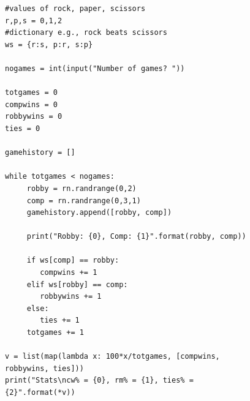 \documentclass{article}
\begin{document}
\begin{enumerate}
\begin{enumerate}
\begin{figure}[h]
{\begin{verbatim}
#values of rock, paper, scissors
r,p,s = 0,1,2
#dictionary e.g., rock beats scissors
ws = {r:s, p:r, s:p}

nogames = int(input("Number of games? "))

totgames = 0
compwins = 0
robbywins = 0
ties = 0

gamehistory = []

while totgames < nogames:
     robby = rn.randrange(0,2)
     comp = rn.randrange(0,3,1)
     gamehistory.append([robby, comp])

     print("Robby: {0}, Comp: {1}".format(robby, comp))

     if ws[comp] == robby:
        compwins += 1
     elif ws[robby] == comp:
        robbywins += 1
     else:
        ties += 1
     totgames += 1

v = list(map(lambda x: 100*x/totgames, [compwins, robbywins, ties]))
print("Stats\ncw% = {0}, rm% = {1}, ties% = {2}".format(*v))
\end{verbatim}}
\end{figure}

\end{enumerate}
\end{enumerate}
\end{document}
